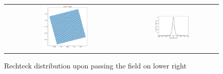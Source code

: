 \documentclass[a4paper,12pt]{article}
\begin{document}
\begin{figure}
\begin{tabular}{cc}
    \includegraphics[width=0.4\textwidth]{../notes/rechteck_post_2.png}
    &
    \includegraphics[width=0.4\textwidth]{../notes/field.png}
  \end{tabular}
  \caption{Rechteck distribution upon passing the field on lower right}
\end{figure}
\end{document}
